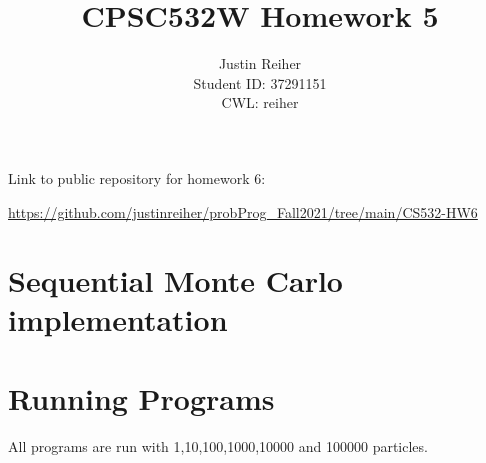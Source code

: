 \documentclass[]{article}
\title{CPSC532W Homework 5}
\author{Justin Reiher\\ Student ID: 37291151\\ CWL: reiher}
\date{}
\begin{document}
\maketitle

Link to public repository for homework 6:
\begin{center}
	\url{https://github.com/justinreiher/probProg_Fall2021/tree/main/CS532-HW6}
\end{center}

\section{Sequential Monte Carlo implementation}

\section{Running Programs}
All programs are run with 1,10,100,1000,10000 and 100000 particles.
\end{document}
